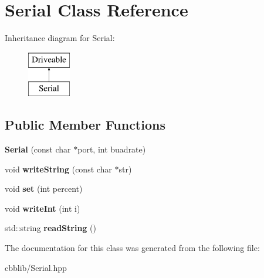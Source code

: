 \hypertarget{classSerial}{\section{\-Serial \-Class \-Reference}
\label{classSerial}
}
\-Inheritance diagram for \-Serial\-:\begin{figure}[H]
\begin{center}
\leavevmode
\includegraphics[height=2.000000cm]{classSerial}
\end{center}
\end{figure}
\subsection*{\-Public \-Member \-Functions}
\begin{DoxyCompactItemize}
\item 
\hypertarget{classSerial_a4286f9d955cf9924df478d2468faec29}{{\bfseries \-Serial} (const char $\ast$port, int buadrate)}\label{classSerial_a4286f9d955cf9924df478d2468faec29}

\item 
\hypertarget{classSerial_a25e7a08d0664d7b3d4e29505bd2fd926}{void {\bfseries write\-String} (const char $\ast$str)}\label{classSerial_a25e7a08d0664d7b3d4e29505bd2fd926}

\item 
\hypertarget{classSerial_a8fcc34c4b464403758a18564e1ac5712}{void {\bfseries set} (int percent)}\label{classSerial_a8fcc34c4b464403758a18564e1ac5712}

\item 
\hypertarget{classSerial_a6ab35fb01e8a0cf1219d53ac56579d7e}{void {\bfseries write\-Int} (int i)}\label{classSerial_a6ab35fb01e8a0cf1219d53ac56579d7e}

\item 
\hypertarget{classSerial_aded59f73a061a02ed82dbec90becc723}{std\-::string {\bfseries read\-String} ()}\label{classSerial_aded59f73a061a02ed82dbec90becc723}

\end{DoxyCompactItemize}


\-The documentation for this class was generated from the following file\-:\begin{DoxyCompactItemize}
\item 
cbblib/\-Serial.\-hpp\end{DoxyCompactItemize}
